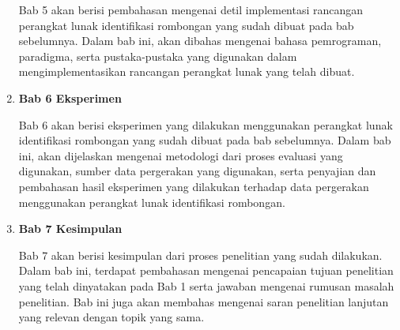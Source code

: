 \begin{enumerate}
    Bab 5 akan berisi pembahasan mengenai detil implementasi rancangan perangkat lunak identifikasi rombongan yang sudah dibuat pada bab sebelumnya. Dalam bab ini, akan dibahas mengenai bahasa pemrograman, paradigma, serta pustaka-pustaka yang digunakan dalam mengimplementasikan rancangan perangkat lunak yang telah dibuat.
    
    \item \textbf{Bab 6 Eksperimen}
    
    Bab 6 akan berisi eksperimen yang dilakukan menggunakan perangkat lunak identifikasi rombongan yang sudah dibuat pada bab sebelumnya. Dalam bab ini, akan dijelaskan mengenai metodologi dari proses evaluasi yang digunakan, sumber data pergerakan yang digunakan, serta penyajian dan pembahasan hasil eksperimen yang dilakukan terhadap data pergerakan menggunakan perangkat lunak identifikasi rombongan.
    
    \item \textbf{Bab 7 Kesimpulan}
    
    Bab 7 akan berisi kesimpulan dari proses penelitian yang sudah dilakukan. Dalam bab ini, terdapat pembahasan mengenai pencapaian tujuan penelitian yang telah dinyatakan pada Bab 1 serta jawaban mengenai rumusan masalah penelitian. Bab ini juga akan membahas mengenai saran penelitian lanjutan yang relevan dengan topik yang sama.
\end{enumerate}
